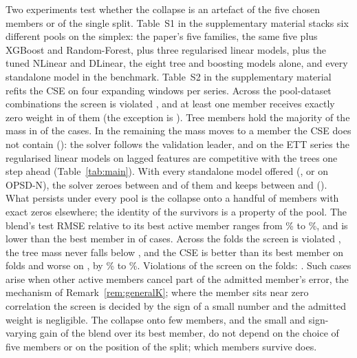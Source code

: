 \documentclass[journal]{IEEEtran}
\newif\iffullversion
\begin{document}
Two experiments test whether the collapse is an artefact of the five chosen members or of the single split. \iffullversion Table~\ref{tab:sens}\else Table~S1 in the supplementary material\fi{} stacks six different pools on the simplex: the paper's five families, the same five plus XGBoost and Random-Forest, plus three regularised linear models, plus the tuned NLinear and DLinear, the eight tree and boosting models alone, and every standalone model in the benchmark. \iffullversion Table~\ref{tab:folds}\else Table~S2 in the supplementary material\fi{} refits the CSE on four expanding windows per series. Across the \sensRows{} pool-dataset combinations the screen is violated \sensViolTimes, and at least one member receives exactly zero weight in \nSensAnyZero{} of them (the exception is \sensNoZeroDesc). Tree members hold the majority of the mass in \nSensHighTree{} of the \sensRows{} cases. In the remaining \nSensLowTree{} the mass moves to a member the CSE does not contain (\sensLowTreeList): the solver follows the validation leader, and on the ETT series the regularised linear models on lagged features are competitive with the trees one step ahead (Table~\ref{tab:main}). With every standalone model offered (\sensAllK, or \sensAllKMin{} on OPSD-N), the solver zeroes between \sensAllZeroMin{} and \sensAllZeroMax{} of them and keeps between \sensAllActiveMin{} and \sensAllActiveMax{} (\sensAllDesc). What persists under every pool is the collapse onto a handful of members with exact zeros elsewhere; the identity of the survivors is a property of the pool. The blend's test RMSE relative to its best active member ranges from \sensGapMin\% to \sensGapMax\%, and is lower than the best member in \sensGapBetter{} of \sensRows{} cases. Across the \foldRows{} folds the screen is violated \foldViolTimes, the tree mass never falls below \foldTreeMassMin, and the CSE is better than its best member on \foldBetter{} folds and worse on \foldWorse{}, by \foldGapMin\% to \foldGapMax\%. Violations of the screen on the folds: \foldViolDesc. Such cases arise when other active members cancel part of the admitted member's error, the mechanism of Remark~\ref{rem:generalK}; where the member sits near zero correlation the screen is decided by the sign of a small number and the admitted weight is negligible. The collapse onto few members, and the small and sign-varying gain of the blend over its best member, do not depend on the choice of five members or on the position of the split; which members survive does.
\end{document}
